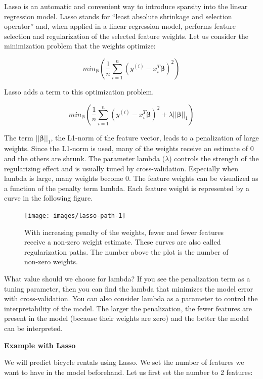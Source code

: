 \documentclass[
  12pt,
]{krantz}
\begin{document}
Lasso is an automatic and convenient way to introduce sparsity into the linear regression model.
Lasso stands for ``least absolute shrinkage and selection operator'' and, when applied in a linear regression model, performs feature selection and regularization of the selected feature weights.
Let us consider the minimization problem that the weights optimize:

\[min_{\boldsymbol{\beta}}\left(\frac{1}{n}\sum_{i=1}^n(y^{(i)}-x_i^T\boldsymbol{\beta})^2\right)\]

Lasso adds a term to this optimization problem.

\[min_{\boldsymbol{\beta}}\left(\frac{1}{n}\sum_{i=1}^n(y^{(i)}-x_{i}^T\boldsymbol{\beta})^2+\lambda||\boldsymbol{\beta}||_1\right)\]

The term \(||\boldsymbol{\beta}||_1\), the L1-norm of the feature vector, leads to a penalization of large weights.
Since the L1-norm is used, many of the weights receive an estimate of 0 and the others are shrunk.
The parameter lambda (\(\lambda\)) controls the strength of the regularizing effect and is usually tuned by cross-validation.
Especially when lambda is large, many weights become 0.
The feature weights can be visualized as a function of the penalty term lambda.
Each feature weight is represented by a curve in the following figure.

\begin{figure}

{\centering \texttt{[image: images/lasso-path-1]} 

}

\caption{With increasing penalty of the weights, fewer and fewer features receive a non-zero weight estimate. These curves are also called regularization paths. The number above the plot is the number of non-zero weights.}\label{fig:lasso-path}
\end{figure}

What value should we choose for lambda?
If you see the penalization term as a tuning parameter, then you can find the lambda that minimizes the model error with cross-validation.
You can also consider lambda as a parameter to control the interpretability of the model.
The larger the penalization, the fewer features are present in the model (because their weights are zero) and the better the model can be interpreted.

\textbf{Example with Lasso}

We will predict bicycle rentals using Lasso.
We set the number of features we want to have in the model beforehand.
Let us first set the number to 2 features:
\end{document}
